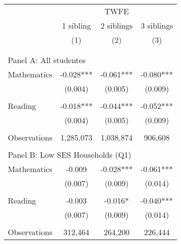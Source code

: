 \makeatletter
{}
{
\makeatother
\begin{tabular}{lccc}
\toprule
\cmidrule(lr){2-4}
& \multicolumn{3}{c}{TWFE} \\
\cmidrule(lr){2-4}
& 1 sibling & 2 siblings & 3 siblings  \\
\cmidrule(lr){2-2} \cmidrule(lr){3-3} \cmidrule(lr){4-4}
& (1) & (2) & (3)\\
\bottomrule
&  &  &  \\
&  &  &   \\
\multicolumn{4}{l}{Panel A: All studentes } \\
\hspace{3mm}Mathematics&      -0.028***&      -0.061***&      -0.080***\\
                    &     (0.004)   &     (0.005)   &     (0.009)   \\
 
&  &  &   \\
\hspace{3mm}Reading &      -0.018***&      -0.044***&      -0.052***\\
                    &     (0.004)   &     (0.005)   &     (0.009)   \\
                    &               &               &               \\
\hspace{3mm}Observations&   1,285,073   &   1,038,874   &     906,608   \\
 
&  &  &   \\
\multicolumn{4}{l}{Panel B: Low SES Households (Q1)} \\
\hspace{3mm}Mathematics&      -0.009   &      -0.028***&      -0.061***\\
                    &     (0.007)   &     (0.009)   &     (0.014)   \\
 
&  &  &   \\
\hspace{3mm}Reading &      -0.003   &      -0.016*  &      -0.040***\\
                    &     (0.007)   &     (0.009)   &     (0.014)   \\
                    &               &               &               \\
\hspace{3mm}Observations&     312,464   &     264,200   &     226,444   \\
 

\end{tabular}}
